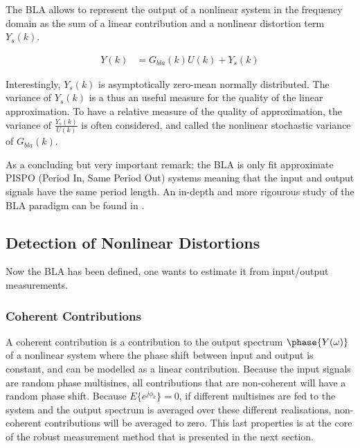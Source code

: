 	The BLA allows to represent the output of a nonlinear system in the frequency domain as the sum of a linear contribution and a nonlinear distortion term $Y_s(k)$.
	
	\begin{align}
		Y(k) &= G_{bla}(k)U(k) + Y_s(k)	
	\end{align}
	
	Interestingly, $Y_s(k)$ is asymptotically zero-mean normally distributed. The variance of $Y_s(k)$ is a thus an useful measure for the quality of the linear approximation. To have a relative measure of the quality of approximation, the variance of $\frac{Y_s(k)}{U(k)}$ is often considered, and called the nonlinear stochastic variance of $G_{bla}(k)$.

	As a concluding but very  important remark: the BLA is only fit approximate PISPO (Period In, Same Period Out) systems meaning that the input and output signals have the same period length. An in-depth and more rigourous study of the BLA paradigm can be found in \cite{sysid}.

	\subsection{Detection of Nonlinear Distortions}

	Now the BLA has been defined, one wants to estimate it from input/output measurements.

	\subsubsection{Coherent Contributions}

	A coherent contribution is a contribution to the output spectrum $\phase{Y(\omega)}$ of a nonlinear system where the phase shift between input and output is constant, and can be modelled as a linear contribution. 
	Because the input signals are random phase multisines, all contributions that are non-coherent will have a random phase shift. Because $E\{e^{j\phi_k}\} = 0$, if different multisines are fed to the system and the output spectrum is averaged over these different realisations, non-coherent contributions will be averaged to zero. This last properties is at the core of the robust measurement method that is presented in the next section.

